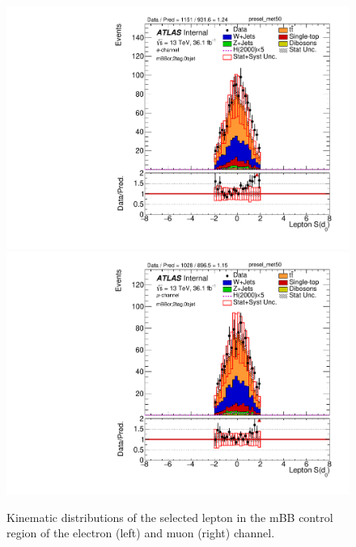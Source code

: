 \begin{figure}[!h]
\begin{center}
\includegraphics[scale=0.33]{./figures/boosted/PlotByChannels/DataMC_2tag_0bjet_mbbcr_elec_presel_met50_Lep_d0sigL}                                                                                 
\includegraphics[scale=0.33]{./figures/boosted/PlotByChannels/DataMC_2tag_0bjet_mbbcr_muon_presel_met50_Lep_d0sigL}                                                                                 
\caption{Kinematic distributions of the selected lepton in the mBB control region of the electron (left) and muon (right) channel.}
\label{fig:boosted_mbbcrleptons_lepton}
\end{center}
\end{figure}


